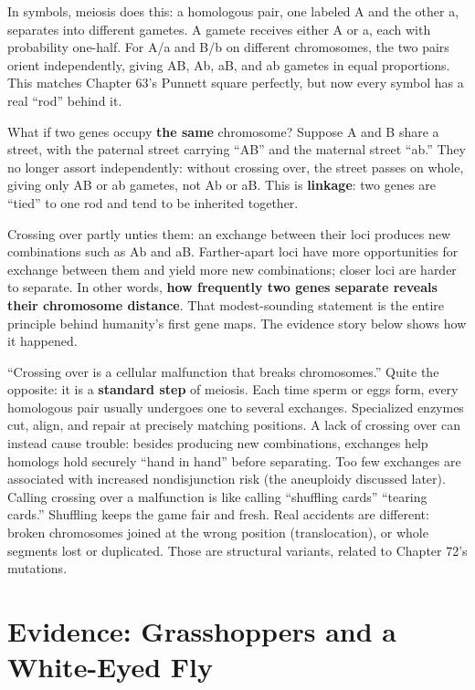 In symbols, meiosis does this: a homologous pair, one labeled A and the other a, separates into different gametes. A gamete receives either A or a, each with probability one-half. For A/a and B/b on different chromosomes, the two pairs orient independently, giving AB, Ab, aB, and ab gametes in equal proportions. This matches Chapter 63's Punnett square perfectly, but now every symbol has a real ``rod'' behind it.

What if two genes occupy \textbf{the same} chromosome? Suppose A and B share a street, with the paternal street carrying ``AB'' and the maternal street ``ab.'' They no longer assort independently: without crossing over, the street passes on whole, giving only AB or ab gametes, not Ab or aB. This is \textbf{linkage}: two genes are ``tied'' to one rod and tend to be inherited together.

Crossing over partly unties them: an exchange between their loci produces new combinations such as Ab and aB. Farther-apart loci have more opportunities for exchange between them and yield more new combinations; closer loci are harder to separate. In other words, \textbf{how frequently two genes separate reveals their chromosome distance}. That modest-sounding statement is the entire principle behind humanity's first gene maps. The evidence story below shows how it happened.

\begin{wuqu}
``Crossing over is a cellular malfunction that breaks chromosomes.'' Quite the opposite: it is a \textbf{standard step} of meiosis. Each time sperm or eggs form, every homologous pair usually undergoes one to several exchanges. Specialized enzymes cut, align, and repair at precisely matching positions. A lack of crossing over can instead cause trouble: besides producing new combinations, exchanges help homologs hold securely ``hand in hand'' before separating. Too few exchanges are associated with increased nondisjunction risk (the aneuploidy discussed later). Calling crossing over a malfunction is like calling ``shuffling cards'' ``tearing cards.'' Shuffling keeps the game fair and fresh. Real accidents are different: broken chromosomes joined at the wrong position (translocation), or whole segments lost or duplicated. Those are structural variants, related to Chapter 72's mutations.
\end{wuqu}

\section{Evidence: Grasshoppers and a White-Eyed Fly}

